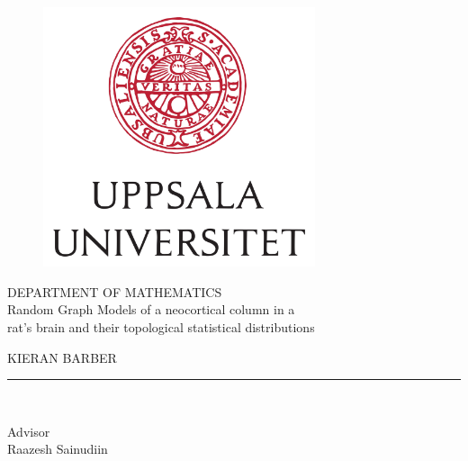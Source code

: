 \documentclass[svgnames]{article}
\begin{document}
\begin{titlepage}
\begin{center}
\vspace*{-1in}
\begin{figure}[htb]
\begin{center}
\includegraphics[width=8cm]{UU_logo.jpg}
\end{center}
\end{figure}

DEPARTMENT OF MATHEMATICS \\
\vspace*{0.15in}
Random Graph Models of a neocortical column in a \\rat's brain and their topological statistical distributions\\
\vspace*{0.3in}
\begin{large}
KIERAN BARBER\\
\end{large}
\vspace*{0.1in}
\rule{80mm}{0.1mm}\\
\vspace*{0.1in}
\begin{large}
Advisor \\
Raazesh Sainudiin
\end{large}
\end{center}
\end{titlepage}

\tableofcontents
\newpage
\end{document}
